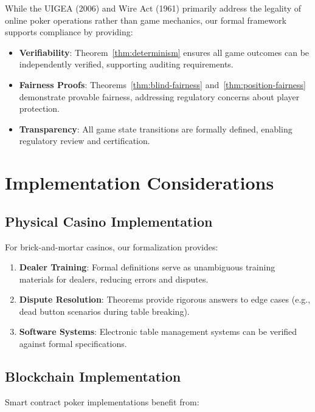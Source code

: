 \documentclass[11pt,a4paper]{article}
\begin{document}
While the UIGEA (2006) \cite{uigea2006} and Wire Act (1961) \cite{wireact1961} primarily address the legality of online poker operations rather than game mechanics, our formal framework supports compliance by providing:

\begin{itemize}
    \item \textbf{Verifiability}: Theorem~\ref{thm:determinism} ensures all game outcomes can be independently verified, supporting auditing requirements.
    \item \textbf{Fairness Proofs}: Theorems~\ref{thm:blind-fairness} and~\ref{thm:position-fairness} demonstrate provable fairness, addressing regulatory concerns about player protection.
    \item \textbf{Transparency}: All game state transitions are formally defined, enabling regulatory review and certification.
\end{itemize}

\section{Implementation Considerations}
\label{sec:implementation}

\subsection{Physical Casino Implementation}

For brick-and-mortar casinos, our formalization provides:

\begin{enumerate}
    \item \textbf{Dealer Training}: Formal definitions serve as unambiguous training materials for dealers, reducing errors and disputes.
    \item \textbf{Dispute Resolution}: Theorems provide rigorous answers to edge cases (e.g., dead button scenarios during table breaking).
    \item \textbf{Software Systems}: Electronic table management systems can be verified against formal specifications.
\end{enumerate}

\subsection{Blockchain Implementation}

Smart contract poker implementations benefit from:
\end{document}
